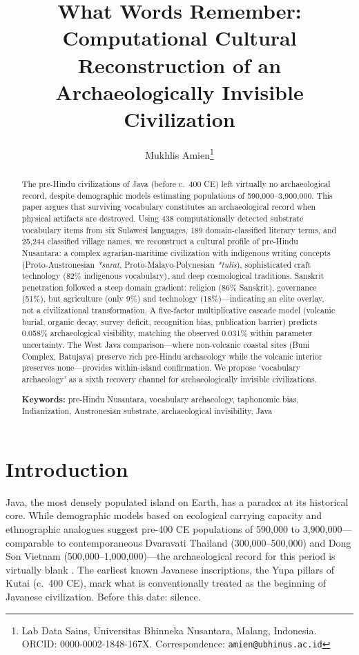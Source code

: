 \documentclass[12pt,a4paper]{article}
\title{What Words Remember: Computational Cultural Reconstruction of an Archaeologically Invisible Civilization}
\author{Mukhlis Amien\thanks{Lab Data Sains, Universitas Bhinneka Nusantara, Malang, Indonesia. ORCID: 0000-0002-1848-167X. Correspondence: \texttt{amien@ubhinus.ac.id}} }
\date{}
\begin{document}
\maketitle

\begin{abstract}
The pre-Hindu civilizations of Java (before c.\ 400 CE) left virtually no archaeological record, despite demographic models estimating populations of 590,000--3,900,000. This paper argues that surviving vocabulary constitutes an archaeological record when physical artifacts are destroyed. Using 438 computationally detected substrate vocabulary items from six Sulawesi languages, 189 domain-classified literary terms, and 25,244 classified village names, we reconstruct a cultural profile of pre-Hindu Nusantara: a complex agrarian-maritime civilization with indigenous writing concepts (Proto-Austronesian \textit{*surat}, Proto-Malayo-Polynesian \textit{*tulis}), sophisticated craft technology (82\% indigenous vocabulary), and deep cosmological traditions. Sanskrit penetration followed a steep domain gradient: religion (86\% Sanskrit), governance (51\%), but agriculture (only 9\%) and technology (18\%)---indicating an elite overlay, not a civilizational transformation. A five-factor multiplicative cascade model (volcanic burial, organic decay, survey deficit, recognition bias, publication barrier) predicts 0.058\% archaeological visibility, matching the observed 0.031\% within parameter uncertainty. The West Java comparison---where non-volcanic coastal sites (Buni Complex, Batujaya) preserve rich pre-Hindu archaeology while the volcanic interior preserves none---provides within-island confirmation. We propose `vocabulary archaeology' as a sixth recovery channel for archaeologically invisible civilizations.

\medskip\noindent\textbf{Keywords:} pre-Hindu Nusantara, vocabulary archaeology, taphonomic bias, Indianization, Austronesian substrate, archaeological invisibility, Java
\end{abstract}

\section{Introduction}

Java, the most densely populated island on Earth, has a paradox at its historical core. While demographic models based on ecological carrying capacity and ethnographic analogues suggest pre-400 CE populations of 590,000 to 3,900,000---comparable to contemporaneous Dvaravati Thailand (300,000--500,000) and Dong Son Vietnam (500,000--1,000,000)---the archaeological record for this period is virtually blank \citep{bellwood2017}. The earliest known Javanese inscriptions, the Yupa pillars of Kutai (c.\ 400 CE), mark what is conventionally treated as the beginning of Javanese civilization. Before this date: silence.
\end{document}
